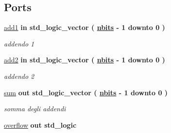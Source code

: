 \subsection*{Ports}
 \begin{DoxyCompactItemize}
\item 
\hyperlink{group___adder_gad6ed6073f8ded668a403a0f7d85c53e8}{add1}  {\bfseries {\bfseries \textcolor{vhdlchar}{in}\textcolor{vhdlchar}{ }}} {\bfseries \textcolor{vhdlchar}{std\+\_\+logic\+\_\+vector}\textcolor{vhdlchar}{ }\textcolor{vhdlchar}{(}\textcolor{vhdlchar}{ }\textcolor{vhdlchar}{ }\textcolor{vhdlchar}{ }\textcolor{vhdlchar}{ }{\bfseries \hyperlink{group___adder_gae1435c07d0cd54b521535e2f8de6f94e}{nbits}} \textcolor{vhdlchar}{-\/}\textcolor{vhdlchar}{ } \textcolor{vhdldigit}{1} \textcolor{vhdlchar}{ }\textcolor{vhdlchar}{downto}\textcolor{vhdlchar}{ }\textcolor{vhdlchar}{ } \textcolor{vhdldigit}{0} \textcolor{vhdlchar}{ }\textcolor{vhdlchar}{)}\textcolor{vhdlchar}{ }} 
\begin{DoxyCompactList}\small\item\em addendo 1 \end{DoxyCompactList}\item 
\hyperlink{group___adder_gabf87ad241134c4d313c708910677575e}{add2}  {\bfseries {\bfseries \textcolor{vhdlchar}{in}\textcolor{vhdlchar}{ }}} {\bfseries \textcolor{vhdlchar}{std\+\_\+logic\+\_\+vector}\textcolor{vhdlchar}{ }\textcolor{vhdlchar}{(}\textcolor{vhdlchar}{ }\textcolor{vhdlchar}{ }\textcolor{vhdlchar}{ }\textcolor{vhdlchar}{ }{\bfseries \hyperlink{group___adder_gae1435c07d0cd54b521535e2f8de6f94e}{nbits}} \textcolor{vhdlchar}{-\/}\textcolor{vhdlchar}{ } \textcolor{vhdldigit}{1} \textcolor{vhdlchar}{ }\textcolor{vhdlchar}{downto}\textcolor{vhdlchar}{ }\textcolor{vhdlchar}{ } \textcolor{vhdldigit}{0} \textcolor{vhdlchar}{ }\textcolor{vhdlchar}{)}\textcolor{vhdlchar}{ }} 
\begin{DoxyCompactList}\small\item\em addendo 2 \end{DoxyCompactList}\item 
\hyperlink{group___adder_ga01f6ea3ddb4d1519676217bcb5959de8}{sum}  {\bfseries {\bfseries \textcolor{vhdlchar}{out}\textcolor{vhdlchar}{ }}} {\bfseries \textcolor{vhdlchar}{std\+\_\+logic\+\_\+vector}\textcolor{vhdlchar}{ }\textcolor{vhdlchar}{(}\textcolor{vhdlchar}{ }\textcolor{vhdlchar}{ }\textcolor{vhdlchar}{ }\textcolor{vhdlchar}{ }{\bfseries \hyperlink{group___adder_gae1435c07d0cd54b521535e2f8de6f94e}{nbits}} \textcolor{vhdlchar}{-\/}\textcolor{vhdlchar}{ } \textcolor{vhdldigit}{1} \textcolor{vhdlchar}{ }\textcolor{vhdlchar}{downto}\textcolor{vhdlchar}{ }\textcolor{vhdlchar}{ } \textcolor{vhdldigit}{0} \textcolor{vhdlchar}{ }\textcolor{vhdlchar}{)}\textcolor{vhdlchar}{ }} 
\begin{DoxyCompactList}\small\item\em somma degli addendi \end{DoxyCompactList}\item 
\hyperlink{group___adder_ga9650307dde287e0bcfa1e26370c006c2}{overflow}  {\bfseries {\bfseries \textcolor{vhdlchar}{out}\textcolor{vhdlchar}{ }}} {\bfseries \textcolor{vhdlchar}{std\+\_\+logic}\textcolor{vhdlchar}{ }} 
\end{DoxyCompactItemize}



